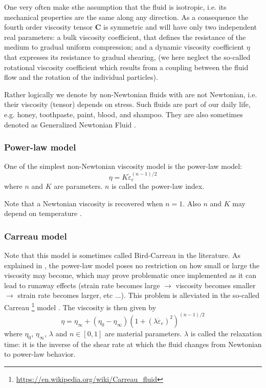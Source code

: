 One very often make sthe assumption that the fluid is isotropic, i.e. its mechanical properties are the 
same along any direction. As a consequence the fourth order viscosity tensor 
${\bm C}$ is symmetric and will have only two independent real parameters: 
a bulk viscosity coefficient, that defines the resistance of the medium to gradual uniform compression; 
and a dynamic viscosity coefficient $\eta$ that expresses its resistance to gradual shearing, 
(we here neglect the so-called rotational viscosity coefficient which results from a coupling between the fluid flow and the rotation of the individual particles). %

Rather logically we denote by non-Newtonian fluids with are not Newtonian, i.e. their viscosity (tensor)
depends on stress. Such fluids are part of our daily life, e.g. honey, toothpaste, paint, blood, and shampoo.
They are also sometimes denoted as Generalized Newtonian Fluid . 
 


\subsubsection{Power-law model \label{ss:powerlaw}} 

One of the simplest non-Newtonian viscosity model is the power-law model:
\begin{equation}
\eta = K \dot{\varepsilon}_{e}^{(n-1)/2}
\end{equation}
where $n$ and $K$ are parameters. $n$ is called the power-law index.

Note that a Newtonian viscosity is recovered when $n=1$. Also $n$ and $K$ may depend on temperature
\cite[p339]{reddybook2}.

\Literature \cite{enmo97}

\subsubsection{Carreau model}

Note that this model is sometimes called Bird-Carreau in the literature. 
As explained in \cite{reddybook2}, the power-law model poses no restriction on 
how small or large the viscosity may become, which may prove problematic once 
implemented as it can lead to runaway effects (strain rate becomes large $\rightarrow$
viscosity becomes smaller $\rightarrow$ strain rate becomes larger, etc ...).
This problem is alleviated in the so-called Carreau
\footnote{\url{https://en.wikipedia.org/wiki/Carreau_fluid}} model \cite{zifr07}. 
The viscosity is then given by
\begin{equation}
\eta = \eta_\infty + (\eta_0-\eta_\infty) \left(1 + (\lambda \dot{\varepsilon}_{e})^2 \right)^{(n-1)/2}
\end{equation}
where $\eta_0$, $\eta_\infty$, $\lambda$ and $n\in[0,1]$ are material parameters. 
$\lambda$ is called the relaxation time: it is the inverse of the shear rate at which 
the fluid changes from Newtonian to power-law behavior.


